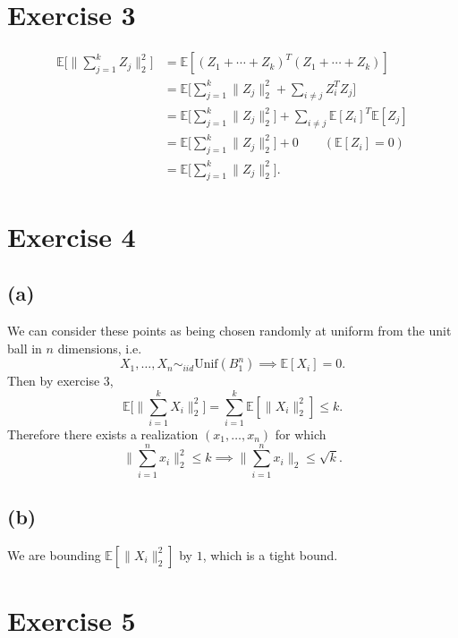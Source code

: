 \documentclass{article}
\begin{document}
\newpage
\section*{Exercise 3}
\begin{align*}
	\mathbb{E} \biggl[ \bigg\| \sum_{j = 1}^{k} Z_j \bigg\|_2^2 \biggr] 
	&= \mathbb{E}[(Z_1 + \cdots + Z_k)^T (Z_1 + \cdots + Z_k)] \\
	&= \mathbb{E} \biggl[ \sum_{j = 1}^{k} \|Z_j\|_2^2 + \sum_{i \neq j}^{} Z_i^T Z_j \biggr] \\
	&= \mathbb{E} \biggl[ \sum_{j = 1}^{k} \|Z_j\|_2^2 \biggr] 
	+ \sum_{i \neq j}^{} \mathbb{E}[Z_i]^T \mathbb{E}[Z_j] \\
	&= \mathbb{E} \biggl[ \sum_{j = 1}^{k} \|Z_j\|_2^2 \biggr] + 0 \quad\quad (\mathbb{E}[Z_i] = 0) \\
	&= \mathbb{E} \biggl[ \sum_{j = 1}^{k} \|Z_j\|_2^2 \biggr].
\end{align*}


\newpage
\section*{Exercise 4}
\subsection*{(a)}
We can consider these points as being chosen randomly at uniform from the unit ball in $n$ dimensions, i.e. 
\[ X_1, \dots, X_n \sim_{iid} \text{Unif}(B_1^n) \implies \mathbb{E}[X_i] = 0. \]
Then by exercise 3, 
\[ \mathbb{E} \biggl[ \bigg\| \sum_{i = 1}^{k} X_i \bigg\|_2^2 \biggr] 
= \sum_{i = 1}^{k} \mathbb{E}[\|X_i\|_2^2] \leq k. \]
Therefore there exists a realization $(x_1, \dots, x_n)$ for which 
\[ \bigg\| \sum_{i = 1}^{n} x_i \bigg\|_2^2 \leq k \implies 
\bigg\| \sum_{i = 1}^{n} x_i \bigg\|_2 \leq \sqrt{k}. \]

\subsection*{(b)}
We are bounding $\mathbb{E}[\|X_i\|_2^2]$ by $1$, which is a tight bound.


\newpage
\section*{Exercise 5}


\newpage
\end{document}

